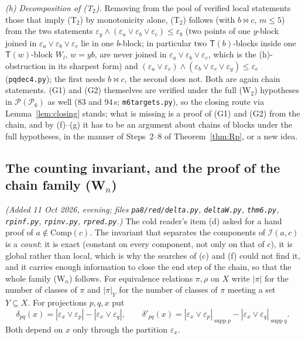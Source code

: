 \documentclass[11pt]{amsart}
\theoremstyle{definition}
\renewcommand{\P}{\mathcal{P}}
\newcommand{\supp}{\operatorname{supp}}
\newcommand{\T}{\mathsf{T}}
\newcommand{\mt}{\bowtie}   %
\begin{document}
\emph{(h) Decomposition of (T$_2$).} Removing from the pool of verified local statements those that imply (T$_2$) by monotonicity alone, (T$_2$) follows (with $b\mt c$, $m\le5$) from the two statements $\varepsilon_y\wedge(\varepsilon_a\vee\varepsilon_b\vee\varepsilon_c)\le\varepsilon_b$ (two points of one $y$-block joined in $\varepsilon_a\vee\varepsilon_b\vee\varepsilon_c$ lie in one $b$-block; in particular two $\T(b)$-blocks inside one $\T(w)$-block $W_l$, $w=yb$, are never joined in $\varepsilon_a\vee\varepsilon_b\vee\varepsilon_c$, which is the (h)-obstruction in its sharpest form) and $(\varepsilon_a\vee\varepsilon_c)\wedge(\varepsilon_b\vee\varepsilon_c\vee\varepsilon_y)\le\varepsilon_c$ (\texttt{pqdec4.py}); the first needs $b\mt c$, the second does not. Both are again chain statements. (G1) and (G2) themselves are verified under the full (W$_2$) hypotheses in $\P(\P_6)$ as well ($83$ and $94$\,s; \texttt{m6targets.py}), so the closing route via Lemma~\ref{lem:closing} stands; what is missing is a proof of (G1) and (G2) from the chain, and by (f)--(g) it has to be an argument about chains of blocks under the full hypotheses, in the manner of Steps~2--8 of Theorem~\ref{thm:Rp}, or a new idea.

\subsection{The counting invariant, and the proof of the chain family (W$_n$)}\label{subsec:count}

\emph{(Added 11 Oct 2026, evening; files \texttt{pa8/red/delta.py}, \texttt{deltaW.py}, \texttt{thm6.py}, \texttt{rpinf.py}, \texttt{rpinv.py}, \texttt{rpred.py}.)} The cold reader's item (d) asked for a hand proof of $a\notin\mathrm{Comp}(c)$. The invariant that separates the components of $\mathcal I(a,c)$ is a \emph{count}: it is exact (constant on every component, not only on that of $c$), it is global rather than local, which is why the searches of (c) and (f) could not find it, and it carries enough information to close the end step of the chain, so that the whole family (W$_n$) follows. For equivalence relations $\pi,\rho$ on $X$ write $|\pi|$ for the number of classes of $\pi$ and $|\pi|_Y$ for the number of classes of $\pi$ meeting a set $Y\subseteq X$. For projections $p,q,x$ put
\[
\delta_{pq}(x)=|\varepsilon_x\vee\varepsilon_p|-|\varepsilon_x\vee\varepsilon_q|,\qquad
\delta'_{pq}(x)=|\varepsilon_x\vee\varepsilon_p|_{\supp p}-|\varepsilon_x\vee\varepsilon_q|_{\supp q}.
\]
Both depend on $x$ only through the partition $\varepsilon_x$.
\end{document}
